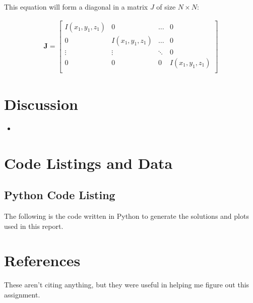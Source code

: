 \documentclass[10pt, oneside, letterpaper]{article}
\begin{document}
This equation will form a diagonal in a matrix $J$ of size $N \times N$:

\begin{align*}
\bm{J} =
\begin{bmatrix}
 I(x_1, y_1, z_1) & 0 & \hdots & 0\\
 0 &  I(x_1, y_1, z_1) & \hdots & 0\\
 \vdots & \vdots & \ddots & 0\\
 0 & 0 & 0 &  I(x_1, y_1, z_1)\\
\end{bmatrix}
\end{align*}


\section{Discussion}

\begin{itemize}
    \item 
\end{itemize}

\newpage
\section{Code Listings and Data}

\subsection{Python Code Listing}
\label{code-listing-python}
The following is the code written in Python to generate the solutions and plots used in this report.


\newpage
\section{References}

These aren't citing anything, but they were useful in helping me figure out this assignment.
\end{document}
